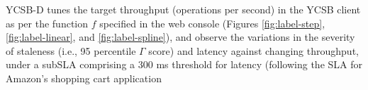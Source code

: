 \documentclass[conference]{IEEEtran}
\begin{document}
 YCSB-D tunes the target throughput (operations per second) in the YCSB client
as per the function $f$ specified in the web console (Figures \ref{fig:label-step}, \ref{fig:label-linear}, and \ref{fig:label-spline}), and observe the variations in the severity of staleness (i.e., 95 percentile {\boldmath$\Gamma$} score)  and latency against changing throughput, under a subSLA comprising a 300 ms threshold for latency (following the SLA for Amazon's shopping cart application %
\end{document}
